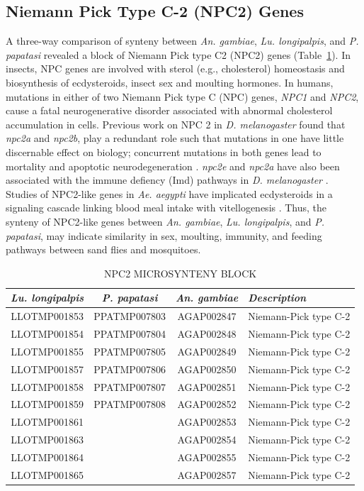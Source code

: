 \subsection{Niemann Pick Type C-2 (NPC2) Genes}
A three-way comparison of synteny between \emph{An. gambiae}, \emph{Lu. longipalpis}, and \emph{P. papatasi} revealed a block of Niemann Pick type C2 (NPC2) genes (Table~\ref{tab:synteny-three-way-npc2}). In insects, NPC genes are involved with sterol (e.g., cholesterol) homeostasis and biosynthesis of ecdysteroids, insect sex and moulting hormones. In humans, mutations in either of two Niemann Pick type C (NPC) genes, \emph{NPC1} and \emph{NPC2}, cause a fatal neurogenerative disorder associated with abnormal cholesterol accumulation in cells.  Previous work on NPC 2 in \emph{D. melanogaster} found that \emph{npc2a} and \emph{npc2b}, play a redundant role such that mutations in one have little discernable effect on biology; concurrent mutations in both genes lead to mortality and apoptotic neurodegeneration \cite{Huang2007}.  \emph{npc2e} and \emph{npc2a} have also been associated with the immune defiency (Imd) pathways in \emph{D. melanogaster} \cite{Shi2012}. Studies of NPC2-like genes in \emph{Ae. aegypti} have implicated ecdysteroids in a signaling cascade linking blood meal intake with vitellogenesis \cite{Sirot2011}.  Thus, the synteny of NPC2-like genes between \emph{An. gambiae}, \emph{Lu. longipalpis}, and \emph{P. papatasi}, may indicate similarity in sex, moulting, immunity, and feeding pathways between sand flies and mosquitoes.

\begin{table}[H]
  \begin{center}
  \caption{\label{tab:synteny-three-way-npc2} NPC2 MICROSYNTENY BLOCK}
  \begin{tabular}{c c c l} \hline
    \emph{Lu. longipalpis} & \emph{P. papatasi} & \emph{An. gambiae} & \emph{Description} \\ \hline
    LLOTMP001853 & PPATMP007803 & AGAP002847 & Niemann-Pick type C-2 \\
    LLOTMP001854 & PPATMP007804 & AGAP002848 & Niemann-Pick type C-2 \\
    LLOTMP001855 & PPATMP007805 & AGAP002849 & Niemann-Pick type C-2 \\
    LLOTMP001857 & PPATMP007806 & AGAP002850 & Niemann-Pick type C-2 \\
    LLOTMP001858 & PPATMP007807 & AGAP002851 & Niemann-Pick type C-2 \\
    LLOTMP001859 & PPATMP007808 & AGAP002852 & Niemann-Pick type C-2 \\
    LLOTMP001861 & & AGAP002853 & Niemann-Pick type C-2 \\
    LLOTMP001863 & & AGAP002854 & Niemann-Pick type C-2 \\
    LLOTMP001864 & & AGAP002855 & Niemann-Pick type C-2 \\
    LLOTMP001865 & & AGAP002857 & Niemann-Pick type C-2
  \end{tabular}
  \end{center}
\end{table}

